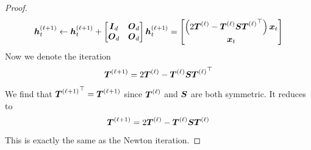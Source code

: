 \begin{proof}
    \begin{equation}
        \boldsymbol{h}_t^{(\ell+1)} \leftarrow \boldsymbol{h}_t^{(\ell+1)} + \begin{bmatrix}
            \boldsymbol{I}_d & \boldsymbol{O}_d \\ 
            \boldsymbol{O}_d & \boldsymbol{O}_d 
        \end{bmatrix} \boldsymbol{h}_t^{(\ell+1)} = \begin{bmatrix}
        \left(2\boldsymbol{T}^{(\ell)} -  \boldsymbol{T}^{(\ell)} \boldsymbol{S} {\boldsymbol{T}^{(\ell)}}^\top \right) \boldsymbol{x}_t \\ \boldsymbol{x}_t 
    \end{bmatrix}
    \end{equation}
    Now we denote the iteration
    \begin{equation}
        \boldsymbol{T}^{(\ell+1)} = 2\boldsymbol{T}^{(\ell)} -  \boldsymbol{T}^{(\ell)} \boldsymbol{S} {\boldsymbol{T}^{(\ell)}}^\top
    \end{equation}
    We find that ${\boldsymbol{T}^{(\ell+1)}}^\top =  \boldsymbol{T}^{(\ell+1)}$ since $ \boldsymbol{T}^{(\ell)}$ and $\boldsymbol{S}$ are both symmetric. It reduces to 
    \begin{equation}
        \boldsymbol{T}^{(\ell+1)} = 2\boldsymbol{T}^{(\ell)} -  \boldsymbol{T}^{(\ell)} \boldsymbol{S} {\boldsymbol{T}^{(\ell)}}
    \end{equation}
    This is exactly the same as the Newton iteration. 



\end{proof}
